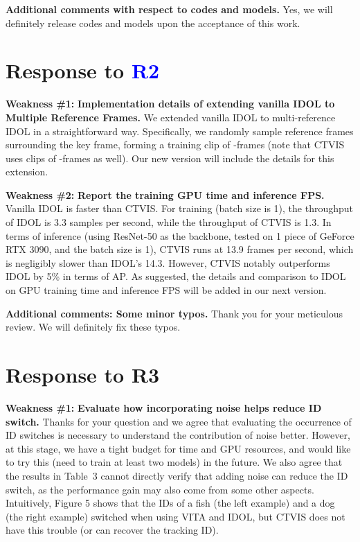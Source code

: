 \documentclass[10pt,twocolumn,letterpaper]{article}
\newcommand{\R}[1]{{\textbf{\ifstrequal{#1}{1}{\textcolor{red}{R#1}}{\ifstrequal{#1}{2}{\textcolor{blue}{R#1}}{\ifstrequal{#1}{3}{\textcolor{green!70!black}{R#1}}{\ifstrequal{#1}{4}{\textcolor{teal}{R#1}}{\textcolor{cyan}{R#1}}}}}}}}
\begin{document}
\noindent\textbf{Additional comments with respect to codes and models.} 
Yes, we will definitely release codes and models upon the acceptance of this work.

\section{Response to \R2}

\noindent\textbf{Weakness \#1:} \textbf{Implementation details of extending vanilla IDOL to Multiple Reference Frames.}
We extended vanilla IDOL to multi-reference IDOL in a straightforward way. Specifically, we randomly sample  reference frames surrounding the key frame, forming a training clip of -frames (note that CTVIS uses clips of -frames as well). Our new version will include the details for this extension. 


\noindent\textbf{Weakness \#2:} \textbf{Report the training GPU time and inference FPS.}
Vanilla IDOL is faster than CTVIS. For training (batch size is 1), the throughput of IDOL is 3.3 samples per second, while the throughput of CTVIS is 1.3. 
In terms of inference (using ResNet-50 as the backbone, tested on 1 piece of GeForce RTX 3090, and the batch size is 1), CTVIS runs at 13.9 frames per second, which is 
negligibly slower than IDOL's 14.3. However, CTVIS notably outperforms IDOL by 5\% in terms of AP. 
As suggested, the details and comparison to IDOL on GPU training time and inference FPS will be added in our next version.  

\noindent\textbf{Additional comments: Some minor typos.} 
Thank you for your meticulous review. We will definitely fix these typos.

\section{Response to \R3}

\noindent\textbf{Weakness \#1:} \textbf{Evaluate how incorporating noise helps reduce ID switch.} 
Thanks for your question and we agree that evaluating the occurrence of ID switches is necessary to understand the contribution of noise better.
However, at this stage, we have a tight budget for time and GPU resources, and would like to try this (need to train at least two models) in the future. We also agree that the results in Table~3 cannot directly verify that adding noise can reduce the ID switch, as the performance gain may also come from some other aspects. 
Intuitively, Figure 5 shows that the IDs of a fish (the left example) and a dog (the right example) switched when using VITA and IDOL, but CTVIS does not have this trouble (or can recover the tracking ID). 
\end{document}
